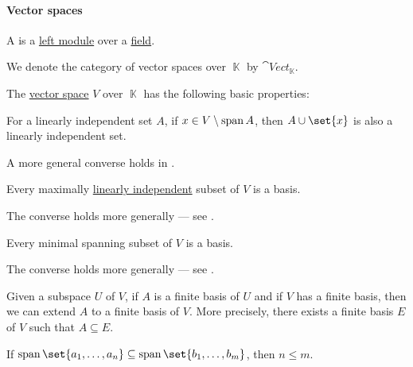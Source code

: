 \paragraph{Vector spaces}

\begin{definition}\label{def:vector_space}
  A  is a \hyperref[def:module]{left module} over a \hyperref[def:field]{field}.

  We denote the category of vector spaces over \( \BbbK \) by \( \cat{Vect}_{\BbbK} \).
\end{definition}

\begin{proposition}\label{thm:def:vector_space}
  The \hyperref[def:vector_space]{vector space} \( V \) over \( \BbbK \) has the following basic properties:
  \begin{thmenum}
     For a linearly independent set \( A \), if \( x \in V \setminus \operatorname{span} A \), then \( A \cup \set{ x } \) is also a linearly independent set.

    A more general converse holds in .

     Every maximally \hyperref[thm:def:linear_dependence]{linearly independent} subset of \( V \) is a basis.

    The converse holds more generally --- see .

     Every minimal spanning subset of \( V \) is a basis.

    The converse holds more generally --- see .

     Given a subspace \( U \) of \( V \), if \( A \) is a finite basis of \( U \) and if \( V \) has a finite basis, then we can extend \( A \) to a finite basis of \( V \). More precisely, there exists a finite basis \( E \) of \( V \) such that \( A \subseteq E \).

     If \( \linspan\set{ a_1, \ldots, a_n } \subseteq \linspan\set{ b_1, \ldots, b_m } \), then \( n \leq m \).
  \end{thmenum}
\end{proposition}

